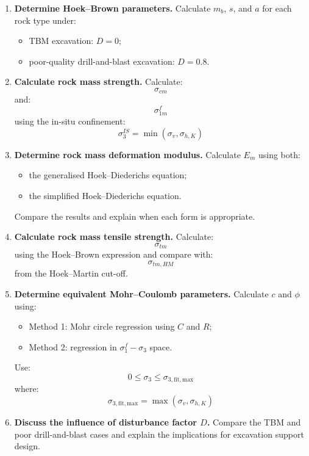 \documentclass[a4paper,12pt]{article}
\begin{document}
\begin{enumerate}
    \item \textbf{Determine Hoek--Brown parameters.}
    Calculate \(m_b\), \(s\), and \(a\) for each rock type under:
    \begin{itemize}
        \item TBM excavation: \(D=0\);
        \item poor-quality drill-and-blast excavation: \(D=0.8\).
    \end{itemize}

    \item \textbf{Calculate rock mass strength.}
    Calculate:
    \[
    \sigma_{cm}
    \]
    and:
    \[
    \sigma_{1m}^f
    \]
    using the in-situ confinement:
    \[
    \sigma_3^{IS}=\min(\sigma_v,\sigma_{h,K})
    \]

    \item \textbf{Determine rock mass deformation modulus.}
    Calculate \(E_m\) using both:
    \begin{itemize}
        \item the generalised Hoek--Diederichs equation;
        \item the simplified Hoek--Diederichs equation.
    \end{itemize}
    Compare the results and explain when each form is appropriate.

    \item \textbf{Calculate rock mass tensile strength.}
    Calculate:
    \[
    \sigma_{tm}
    \]
    using the Hoek--Brown expression and compare with:
    \[
    \sigma_{tm,HM}
    \]
    from the Hoek--Martin cut-off.

    \item \textbf{Determine equivalent Mohr--Coulomb parameters.}
    Calculate \(c\) and \(\phi\) using:
    \begin{itemize}
        \item Method 1: Mohr circle regression using \(C\) and \(R\);
        \item Method 2: regression in \(\sigma_1^f-\sigma_3\) space.
    \end{itemize}
    Use:
    \[
    0 \leq \sigma_3 \leq \sigma_{3,\mathrm{fit,max}}
    \]
    where:
    \[
    \sigma_{3,\mathrm{fit,max}}=\max(\sigma_v,\sigma_{h,K})
    \]

    \item \textbf{Discuss the influence of disturbance factor \(D\).}
    Compare the TBM and poor drill-and-blast cases and explain the implications for
    excavation support design.
\end{enumerate}
\end{document}
